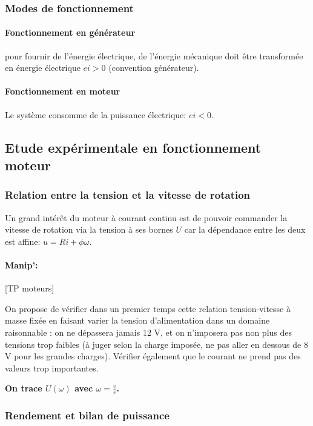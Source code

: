 \documentclass[11pt]{report}
\numberwithin{figure}{section}
\numberwithin{equation}{section}
\numberwithin{table}{section}
\newcommand{\1}{\boldsymbol{1}}
\begin{document}
\subsubsection{Modes de fonctionnement}

\paragraph{Fonctionnement en générateur} pour fournir de l’énergie électrique, de l’énergie mécanique doit être transformée en énergie électrique $ei > 0$ (convention générateur).

\paragraph{Fonctionnement en moteur} Le système consomme de la puissance électrique: $e i < 0$.

\subsection{Etude expérimentale en fonctionnement moteur}

\subsubsection{Relation entre la tension et la vitesse de rotation}

Un grand intérêt du moteur à courant continu est de pouvoir commander la vitesse de rotation via la tension à ses bornes $U$ car la dépendance entre les deux est affine: $u = R i + \phi \omega$. 

\paragraph{Manip':} [TP moteurs]

On propose de vérifier dans un premier temps cette relation tension-vitesse à masse fixée en faisant varier la tension d'alimentation dans un domaine raisonnable : on ne dépassera jamais 12 V, et on n'imposera pas non plus des tensions trop faibles (à juger selon la charge imposée, ne pas aller en dessous de 8 V pour les grandes charges). Vérifier également que le courant ne prend pas des valeurs trop importantes.

\textbf{On trace $U(\omega)$ avec $\omega = \frac{v}{r}$.}

\subsubsection{Rendement et bilan de puissance}
\end{document}

